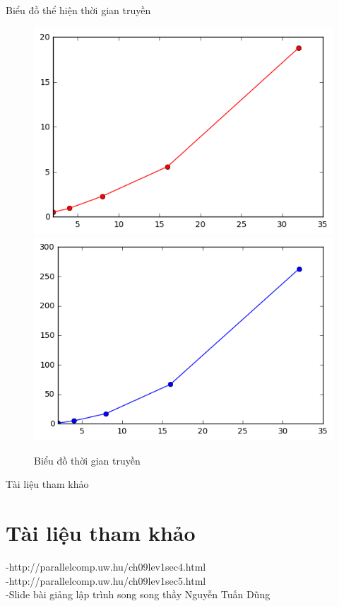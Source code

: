 \documentclass{beamer}
\begin{document}
\begin{frame}{Biểu đồ thể hiện thời gian truyền}
\begin{figure}[H]
\includegraphics[scale=0.4]{tpame.png}
\includegraphics[scale=0.4]{tpaov.png}
\caption{Biểu đồ thời gian truyền}
\end{figure}


\end{frame}
\begin{frame}{Tài liệu tham khảo}
\section*{Tài liệu tham khảo}
-http://parallelcomp.uw.hu/ch09lev1sec4.html\\
-http://parallelcomp.uw.hu/ch09lev1sec5.html\\
-Slide bài giảng lập trình song song thầy Nguyễn Tuấn Dũng

\end{frame}
\end{document}
